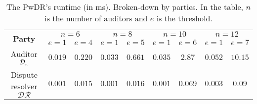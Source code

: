 

 \begin{table*}[!htb]

\caption{ {\small{ The PwDR's runtime (in ms). Broken-down by parties. In the table, $n$ is the number of auditors and $e$ is the threshold.}}} \label{table::PwDR-runtime} 
 \vspace{-4mm}
\begin{center}
\renewcommand{\arraystretch}{.8}
\begin{tabular}{|c|c|c|c|c|c|c|c|c|} 

   \hline
   

\multirow{2}{*}{\scriptsize \textbf{Party}}& \multicolumn{2}{c|}{\scriptsize $n=6$}& \multicolumn{2}{c|}{\scriptsize $n=8$}&\multicolumn{2}{c|}{\scriptsize $n=10$}&\multicolumn{2}{c|}{\scriptsize $n=12$}\\
 \cline{2-9} 
&\scriptsize$e=1$&\scriptsize$e=4$&\scriptsize$e=1$ &\scriptsize$e=5$&\scriptsize$e=1$&\scriptsize$e=6$&\scriptsize$e=1$&\scriptsize$e=7$\\



         
            \cline{1-5} 

 
   \scriptsize   {Auditor $\mathcal{D}_{\scriptscriptstyle n}$ }&  \cellcolor{gray!20}\scriptsize$0.019$&  \cellcolor{gray!20}\scriptsize$0.220$& \cellcolor{gray!20}  \scriptsize$0.033$&   \cellcolor{gray!20}\scriptsize$0.661$&  \cellcolor{gray!20}\scriptsize$0.035$&  \cellcolor{gray!20}\scriptsize$2.87$&  \cellcolor{gray!20}\scriptsize$0.052$&  \cellcolor{gray!20}\scriptsize$10.15$\\      
           
            \cline{1-9} 

 \scriptsize Dispute resolver $\mathcal{DR}$&  \cellcolor{gray!20}\scriptsize$0.001$&  \cellcolor{gray!20}\scriptsize$0.015$&   \cellcolor{gray!20}\scriptsize $0.001$&   \cellcolor{gray!20}\scriptsize$0.016$&  \cellcolor{gray!20}\scriptsize$0.001$&  \cellcolor{gray!20}\scriptsize$0.069$&  \cellcolor{gray!20}\scriptsize$0.003$&  \cellcolor{gray!20}\scriptsize$0.09$\\
 
 \hline
 
\end{tabular}  %
\end{center}

\end{table*}




